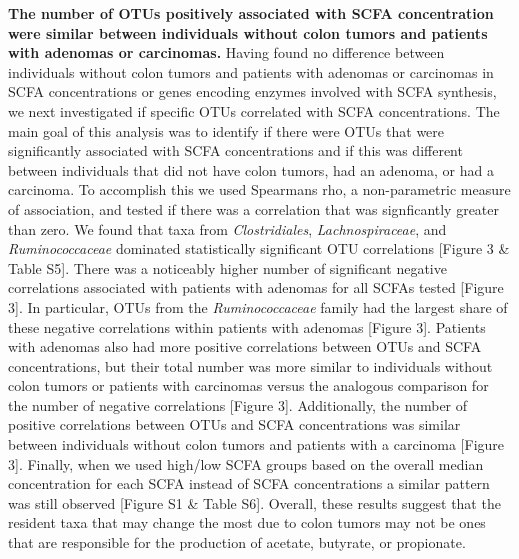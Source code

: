 \documentclass[11pt,]{article}
\begin{document}
\textbf{The number of OTUs positively associated with SCFA concentration
were similar between individuals without colon tumors and patients with
adenomas or carcinomas.} Having found no difference between individuals
without colon tumors and patients with adenomas or carcinomas in SCFA
concentrations or genes encoding enzymes involved with SCFA synthesis,
we next investigated if specific OTUs correlated with SCFA
concentrations. The main goal of this analysis was to identify if there
were OTUs that were significantly associated with SCFA concentrations
and if this was different between individuals that did not have colon
tumors, had an adenoma, or had a carcinoma. To accomplish this we used
Spearmans rho, a non-parametric measure of association, and tested if
there was a correlation that was signficantly greater than zero. We
found that taxa from \emph{Clostridiales}, \emph{Lachnospiraceae}, and
\emph{Ruminococcaceae} dominated statistically significant OTU
correlations {[}Figure 3 \& Table S5{]}. There was a noticeably higher
number of significant negative correlations associated with patients
with adenomas for all SCFAs tested {[}Figure 3{]}. In particular, OTUs
from the \emph{Ruminococcaceae} family had the largest share of these
negative correlations within patients with adenomas {[}Figure 3{]}.
Patients with adenomas also had more positive correlations between OTUs
and SCFA concentrations, but their total number was more similar to
individuals without colon tumors or patients with carcinomas versus the
analogous comparison for the number of negative correlations {[}Figure
3{]}. Additionally, the number of positive correlations between OTUs and
SCFA concentrations was similar between individuals without colon tumors
and patients with a carcinoma {[}Figure 3{]}. Finally, when we used
high/low SCFA groups based on the overall median concentration for each
SCFA instead of SCFA concentrations a similar pattern was still observed
{[}Figure S1 \& Table S6{]}. Overall, these results suggest that the
resident taxa that may change the most due to colon tumors may not be
ones that are responsible for the production of acetate, butyrate, or
propionate.
\end{document}

